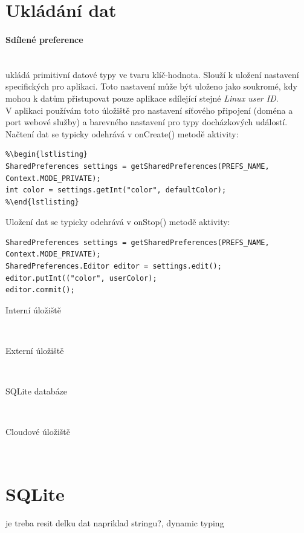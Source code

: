 \documentclass{bakalarka}
\begin{document}
\section{Ukládání dat}

\paragraph{Sdílené preference}\hfill \\ukládá primitivní datové typy ve tvaru klíč-hodnota. Slouží k uložení nastavení specifických pro aplikaci. Toto nastavení může být uloženo jako soukromé, kdy mohou k datům přistupovat pouze aplikace sdílející stejné \emph{Linux user ID}.\\ V aplikaci používám toto úložiště pro nastavení síťového připojení (doména a port webové služby) a barevného nastavení pro typy docházkových událostí.\\
Načtení dat se typicky odehrává v onCreate() metodě aktivity:
\begin{verbatim}
%\begin{lstlisting}
SharedPreferences settings = getSharedPreferences(PREFS_NAME, 
Context.MODE_PRIVATE);
int color = settings.getInt("color", defaultColor);
%\end{lstlisting}
\end{verbatim}
\noindent
Uložení dat se typicky odehrává v onStop() metodě aktivity:
\begin{verbatim}
SharedPreferences settings = getSharedPreferences(PREFS_NAME, 
Context.MODE_PRIVATE);
SharedPreferences.Editor editor = settings.edit();
editor.putInt(("color", userColor);
editor.commit();
\end{verbatim}

\begin{description}
\item [Interní úložiště]\hfill \\
\item [Externí úložiště]\hfill \\
\item [SQLite databáze]\hfill \\
\item [Cloudové úložiště]\hfill \\
\end{description}

\section{SQLite}
je treba resit delku dat napriklad stringu?, dynamic typing
\end{document}
